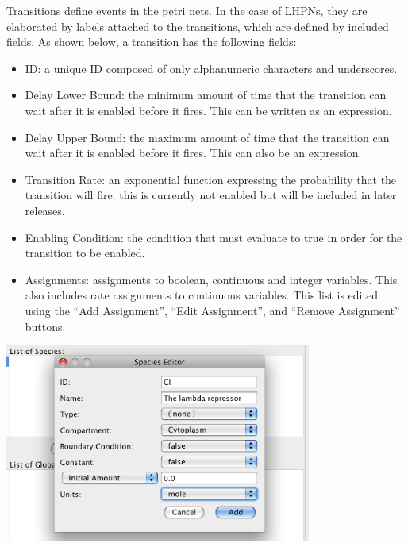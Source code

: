 \documentclass[titlepage,11pt]{article}
\begin{document}
\noindent
Transitions define events in the petri nets.  In the case of LHPNs, they are 
elaborated by labels attached to the transitions, which are defined by included
fields.
As shown below, a transition has the following fields:
\begin{itemize}
\item ID: a unique ID composed of only alphanumeric characters and 
       underscores.
\item Delay Lower Bound: the minimum amount of time that the transition can wait
       after it is enabled before it fires.  This can be written as an 
       expression.
\item Delay Upper Bound: the maximum amount of time that the transition can wait
       after it is enabled before it fires.  This can also be an expression.
\item Transition Rate: an exponential function expressing the probability that
       the transition will fire.  this is currently not enabled but will be
       included in later releases.
\item Enabling Condition: the condition that must evaluate to true in order for
       the transition to be enabled.
\item Assignments: assignments to boolean, continuous and integer variables.
       This also includes rate assignments to continuous variables. This list
       is edited using the ``Add Assignment'', ``Edit Assignment'', and
       ``Remove Assignment'' buttons.
\end{itemize}
\begin{center}
\includegraphics[height=65mm]{screenshots/species}
\end{center}
\end{document}
